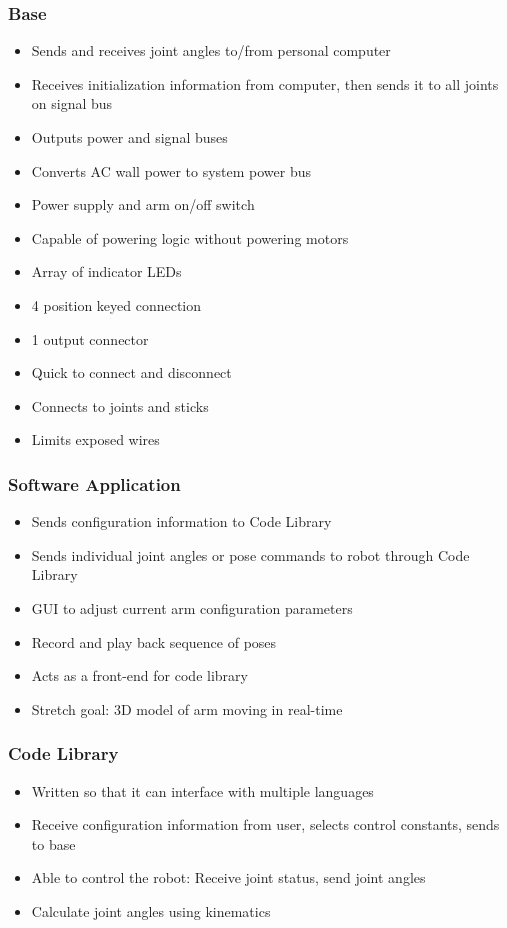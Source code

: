 \subsubsection{Base}
\begin{itemize}
	\item Sends and receives joint angles to/from personal computer
	\item Receives initialization information from computer, then sends it to all joints on signal bus
	\item Outputs power and signal buses
	\item Converts AC wall power to system power bus
	\item Power supply and arm on/off switch
	\item Capable of powering logic without powering motors
	\item Array of indicator LEDs
	\item 4 position keyed connection
	\item 1 output connector
	\item Quick to connect and disconnect
	\item Connects to joints and sticks
	\item Limits exposed wires
\end{itemize}

\subsubsection{Software Application}
\begin{itemize}
	\item Sends configuration information to Code Library
	\item Sends individual joint angles or pose commands to robot through Code Library
	\item GUI to adjust current arm configuration parameters
	\item Record and play back sequence of poses
	\item Acts as a front-end for code library
	\item Stretch goal: 3D model of arm moving in real-time
\end{itemize}

\subsubsection{Code Library}
\begin{itemize}
	\item Written so that it can interface with multiple languages
	\item Receive configuration information from user, selects control constants, sends to base
	\item Able to control the robot: Receive joint status, send joint angles
	\item Calculate joint angles using kinematics
\end{itemize}

